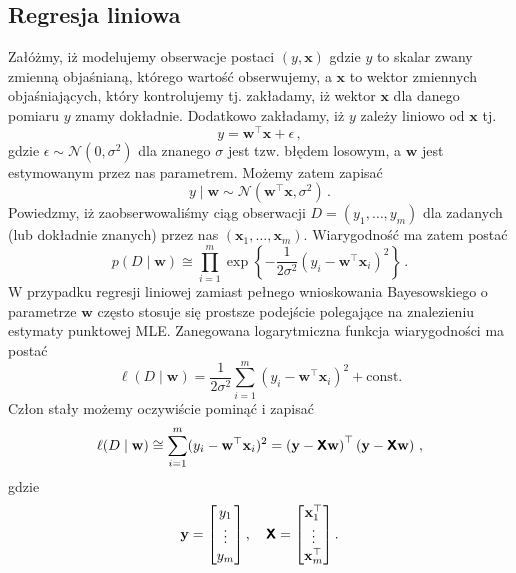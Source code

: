 \documentclass{myclass}
\begin{document}
\subsection{Regresja liniowa}

Załóżmy, iż modelujemy obserwacje postaci \((y,\mathbf{x})\) gdzie \(y\) to skalar zwany zmienną
objaśnianą, którego wartość obserwujemy, a \(\mathbf{x}\) to wektor zmiennych objaśniających, który
kontrolujemy tj. zakładamy, iż wektor \(\mathbf{x}\) dla danego pomiaru \(y\) znamy dokładnie.
Dodatkowo zakładamy, iż \(y\) zależy liniowo od \(\mathbf{x}\) tj.
\begin{equation*}
    y = \mathbf{w}^\top\mathbf{x} + \epsilon\,,
\end{equation*}
gdzie \(\epsilon \sim \mathcal{N}(0, \sigma^2)\) dla znanego \(\sigma\) jest tzw. błędem losowym, a
\(\mathbf{w}\) jest estymowanym przez nas parametrem. Możemy zatem zapisać
\begin{equation*}
    y \mid \mathbf{w} \sim \mathcal{N}(\mathbf{w}^\top\mathbf{x}, \sigma^2)\,.
\end{equation*}
Powiedzmy, iż zaobserwowaliśmy ciąg obserwacji \(D = (y_1, \ldots, y_m)\) dla zadanych (lub
dokładnie znanych) przez nas \((\mathbf{x}_1,\ldots,\mathbf{x}_m)\). Wiarygodność ma zatem postać
\begin{equation*}
    p(D \mid \mathbf{w}) \cong \prod_{i=1}^m \exp\left\{-\frac{1}{2\sigma^2}\left(y_i - \mathbf{w}^\top\mathbf{x}_i\right)^2\right\}\,.
\end{equation*}
W przypadku regresji liniowej zamiast pełnego wnioskowania Bayesowskiego o parametrze \(\mathbf{w}\)
często stosuje się prostsze podejście polegające na znalezieniu estymaty punktowej MLE. Zanegowana
logarytmiczna funkcja wiarygodności ma postać
\begin{equation*}
    \ell(D \mid \mathbf{w}) = \frac{1}{2\sigma^2}\sum_{i=1}^m(y_i - \mathbf{w}^\top\mathbf{x}_i)^2 + \text{const.}
\end{equation*}
Człon stały możemy oczywiście pominąć i zapisać
\begin{equation*}
    \ell(D \mid \mathbf{w}) \cong \sum_{i=1}^m(y_i - \mathbf{w}^\top\mathbf{x}_i)^2 = \left(\mathbf{y} - \boldsymbol{\mathsf{X}}\mathbf{w}\right)^\top\left(\mathbf{y} - \boldsymbol{\mathsf{X}}\mathbf{w}\right)\,,
\end{equation*}
gdzie
\begin{equation*}
    \mathbf{y} = \mqty[y_1 \\ \vdots \\ y_m]\,,\quad \oper{X} = \mqty[\mathbf{x}_1^\top \\ \vdots \\ \mathbf{x}_m^\top]\,.
\end{equation*}
\end{document}

